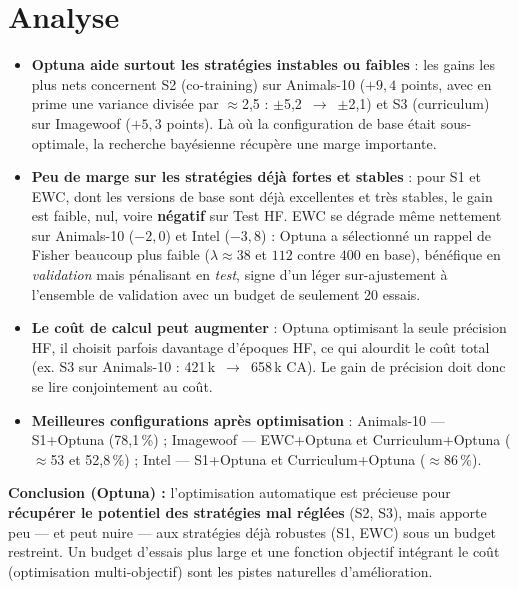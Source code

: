 \documentclass[11pt,a4paper,openany]{book}
\begin{document}
\section{Analyse}

\begin{itemize}
  \item \textbf{Optuna aide surtout les stratégies instables ou faibles} : les gains les plus nets concernent S2 (co-training) sur Animals-10 ($+9,4$ points, avec en prime une variance divisée par $\approx$2,5 : $\pm$5,2~$\rightarrow$~$\pm$2,1) et S3 (curriculum) sur Imagewoof ($+5,3$ points). Là où la configuration de base était sous-optimale, la recherche bayésienne récupère une marge importante.
  \item \textbf{Peu de marge sur les stratégies déjà fortes et stables} : pour S1 et EWC, dont les versions de base sont déjà excellentes et très stables, le gain est faible, nul, voire \textbf{négatif} sur Test HF. EWC se dégrade même nettement sur Animals-10 ($-2,0$) et Intel ($-3,8$) : Optuna a sélectionné un rappel de Fisher beaucoup plus faible ($\lambda\approx38$ et $112$ contre $400$ en base), bénéfique en \emph{validation} mais pénalisant en \emph{test}, signe d'un léger sur-ajustement à l'ensemble de validation avec un budget de seulement 20 essais.
  \item \textbf{Le coût de calcul peut augmenter} : Optuna optimisant la seule précision HF, il choisit parfois davantage d'époques HF, ce qui alourdit le coût total (ex. S3 sur Animals-10 : 421\,k~$\rightarrow$~658\,k CA). Le gain de précision doit donc se lire conjointement au coût.
  \item \textbf{Meilleures configurations après optimisation} : Animals-10 — S1+Optuna (78,1\,\%) ; Imagewoof — EWC+Optuna et Curriculum+Optuna ($\approx$53 et 52,8\,\%) ; Intel — S1+Optuna et Curriculum+Optuna ($\approx$86\,\%).
\end{itemize}

\begin{decisionbox}
  \textbf{Conclusion (Optuna) :} l'optimisation automatique est précieuse pour \textbf{récupérer le potentiel des stratégies mal réglées} (S2, S3), mais apporte peu — et peut nuire — aux stratégies déjà robustes (S1, EWC) sous un budget restreint. Un budget d'essais plus large et une fonction objectif intégrant le coût (optimisation multi-objectif) sont les pistes naturelles d'amélioration.
\end{decisionbox}


\end{document}
